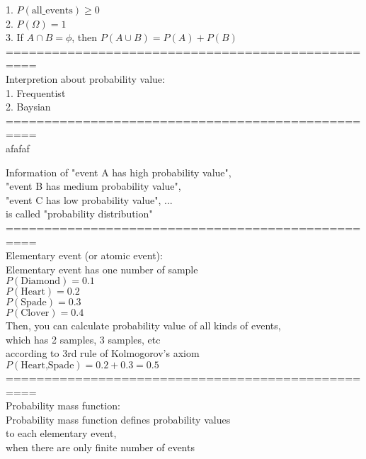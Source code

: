 \documentclass{article}
\begin{document}
1. $P(\text{all\_events})\ge 0$ \\ 
2. $P(\Omega)=1$ \\ 
3. If $A\cap B=\phi$, then $P(A\cup B)=P(A)+P(B)$ \\ 

================================================== \\
Interpretion about probability value: \\ 
1. Frequentist \\ 
2. Baysian \\ 

================================================== \\
afafaf

Information of "event A has high probability value", \\ 
"event B has medium probability value", \\ 
"event C has low probability value", ... \\ 
is called "probability distribution" \\ 

================================================== \\
Elementary event (or atomic event): \\ 
Elementary event has one number of sample \\ 

$P({\text{Diamond}})=0.1$ \\ 
$P({\text{Heart}})=0.2$ \\ 
$P({\text{Spade}})=0.3$ \\ 
$P({\text{Clover}})=0.4$ \\ 

Then, you can calculate probability value of all kinds of events, \\ 
which has 2 samples, 3 samples, etc \\ 
according to 3rd rule of Kolmogorov's axiom \\ 

$P({\text{Heart,Spade}})=0.2+0.3=0.5$ \\ 

================================================== \\
Probability mass function: \\ 
Probability mass function defines probability values \\
to each elementary event, \\ 
when there are only finite number of events \\ 
\end{document}

